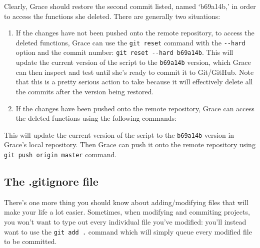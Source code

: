 \documentclass[
]{book}
\newenvironment{Shaded}{\begin{snugshade}}{\end{snugshade}}
\newcommand{\NormalTok}[1]{#1}
\newcommand{\SpecialCharTok}[1]{\textcolor[rgb]{0.00,0.00,0.00}{#1}}
\newcommand{\StringTok}[1]{\textcolor[rgb]{0.31,0.60,0.02}{#1}}
\begin{document}
Clearly, Grace should restore the second commit listed, named `b69a14b,' in order to access the functions she deleted. There are generally two situations:

\begin{enumerate}
\def\labelenumi{\arabic{enumi}.}
\item
  If the changes have not been pushed onto the remote repository, to access the deleted functions, Grace can use the \texttt{git\ reset} command with the \texttt{-\/-hard} option and the commit number: \texttt{git\ reset\ -\/-hard\ b69a14b}. This will update the current version of the script to the \texttt{b69a14b} version, which Grace can then inspect and test until she's ready to commit it to Git/GitHub. Note that this is a pretty serious action to take because it will effectively delete all the commits after the version being restored.
\item
  If the changes have been pushed onto the remote repository, Grace can access the deleted functions using the following commands:
\end{enumerate}

\begin{Shaded}
\end{Shaded}

This will update the current version of the script to the \texttt{b69a14b} version in Grace's local repository. Then Grace can push it onto the remote repository using \texttt{git\ push\ origin\ master} command.

\hypertarget{the-.gitignore-file}{%
\subsection{The .gitignore file}\label{the-.gitignore-file}}

There's one more thing you should know about adding/modifying files that will make your life a lot easier. Sometimes, when modifying and commiting projects, you won't want to type out every individual file you've modified: you'll instead want to use the \texttt{git\ add\ .} command which will simply queue every modified file to be committed.
\end{document}
